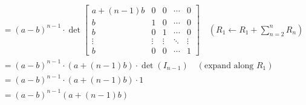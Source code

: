 \begin{solution}
\begin{align*}
        &= (a-b)^{n-1} \cdot \det\begin{bmatrix}
            a+(n-1)b & 0 & 0 & \cdots & 0 \\
            b & 1 & 0 & \cdots & 0 \\
            b & 0 & 1 & \cdots & 0 \\
            \vdots & \vdots & \vdots & \ddots & \vdots \\
            b & 0 & 0 & \cdots & 1
        \end{bmatrix} \quad (R_1\leftarrow R_1+\sum_{n=2}^n R_n) \\
        &= (a-b)^{n-1} \cdot (a+(n-1)b) \cdot \det(I_{n-1}) \quad (\text{expand along } R_1) \\
        &= (a-b)^{n-1} \cdot (a+(n-1)b) \cdot 1 \\
        &= \boxed{(a-b)^{n-1} (a+(n-1)b)}
    \end{align*}
\end{solution}